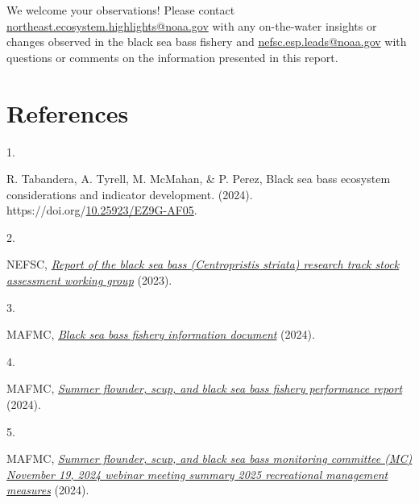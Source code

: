 \documentclass[
  10pt,
  letterpaper,
  DIV=11,
  numbers=noendperiod]{scrartcl}
\newlength{\cslhangindent}
\newlength{\csllabelwidth}
\newenvironment{CSLReferences}[2] %
 {\begin{list}{}{%
  \setlength{\itemindent}{0pt}
  \setlength{\leftmargin}{0pt}
  \setlength{\parsep}{0pt}
  \ifodd #1
   \setlength{\leftmargin}{\cslhangindent}
   \setlength{\itemindent}{-1\cslhangindent}
  \fi
  \setlength{\itemsep}{#2\baselineskip}}}
 {\end{list}}
\newcommand{\CSLLeftMargin}[1]{\parbox[t]{\csllabelwidth}{\strut#1\strut}}
\newcommand{\CSLRightInline}[1]{\parbox[t]{\linewidth - \csllabelwidth}{\strut#1\strut}}
\begin{document}
\centering\normalsize

We welcome your observations! Please contact
\url{northeast.ecosystem.highlights@noaa.gov} with any on-the-water
insights or changes observed in the black sea bass fishery and
\url{nefsc.esp.leads@noaa.gov} with questions or comments on the
information presented in this report.

\newpage
{}

\section{References}\label{references}

\label{refs}
\begin{CSLReferences}{0}{0}
\CSLLeftMargin{1. }%
\CSLRightInline{R. Tabandera, A. Tyrell, M. McMahan, \& P. Perez, Black
sea bass ecosystem considerations and indicator development. (2024).
https://doi.org/\href{https://doi.org/10.25923/EZ9G-AF05}{10.25923/EZ9G-AF05}.}

\CSLLeftMargin{2. }%
\CSLRightInline{NEFSC,
\emph{\href{https://d23h0vhsm26o6d.cloudfront.net/11a.-2023_BSB_UNIT_RTWG_Report_V2_12_2_2023.pdf}{Report
of the black sea bass (\emph{{Centropristis} striata}) research track
stock assessment working group}} (2023).}

\CSLLeftMargin{3. }%
\CSLRightInline{MAFMC,
\emph{\href{https://static1.squarespace.com/static/511cdc7fe4b00307a2628ac6/t/6683032fa306b9070227348b/1719862063436/2024_BSB-fishery-info-doc.pdf}{Black
sea bass fishery information document}} (2024).}

\CSLLeftMargin{4. }%
\CSLRightInline{MAFMC,
\emph{\href{https://static1.squarespace.com/static/511cdc7fe4b00307a2628ac6/t/6697d5dde4c39b20168045b7/1721226717179/b_SFSBSB-FPR-Jul-2024.pdf}{Summer
flounder, scup, and black sea bass fishery performance report}} (2024).}

\CSLLeftMargin{5. }%
\CSLRightInline{MAFMC,
\emph{\href{https://static1.squarespace.com/static/511cdc7fe4b00307a2628ac6/t/674755f846e791454569703f/1732728312681/01_2025+SF+Rec+Measures.pdf}{Summer
flounder, scup, and black sea bass monitoring committee ({MC})
{November} 19, 2024 webinar meeting summary 2025 recreational management
measures}} (2024).}


\end{CSLReferences}
\end{document}
